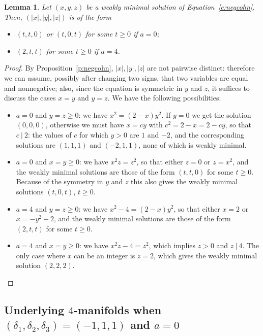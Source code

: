 \documentclass[11pt,a4paper]{amsart}
\newcommand{\de}{\delta}
\newtheorem{lemma}[thm]{Lemma}
\theoremstyle{definition}
\numberwithin{equation}{section}
\begin{document}
\begin{lemma}\label{l:negcohn}
	Let $(x,y,z)$ be a weakly minimal solution of Equation~\eqref{e:negcohn}. 
	Then, $(|x|,|y|,|z|)$ is of the form 
\begin{itemize}
    \item $(t,t,0)$ or $(t,0,t)$ for some $t\geq 0$ if $a=0$;
    \item $(2,t,t)$ for some $t\geq 0$ if $a=4$.
\end{itemize}
\end{lemma} 

\begin{proof}
By Proposition~\ref{p:negcohn}, $|x|,|y|,|z|$ are not pairwise distinct: therefore we can assume, possibly after changing two signs, that two variables are equal and nonnegative; also, since the equation is symmetric in $y$ and $z$, it suffices to discuss the cases $x=y$ and $y=z$.
We have the following possibilities:
\begin{itemize}
\item 
$a=0$ and $y=z\ge 0$: we have $x^2=(2-x)y^2$.
If $y=0$ we get the solution $(0,0,0)$, otherwise we must have $x=cy$ with $c^2=2-x=2-cy$, so that 
$c\ |\ 2$: the values of $c$ for which $y>0$ are $1$ and $-2$, and the corresponding solutions are $(1,1,1)$ and $(-2,1,1)$, none of which is weakly minimal.
\item 
$a=0$ and $x=y \ge 0$: we have $x^2z=z^2$, so that either $z=0$ or $z=x^2$, and the weakly minimal solutions are those of the form $(t,t,0)$ for some $t \ge 0$. Because of the symmetry in $y$ and $z$ this also gives 
the weakly minimal solutions $(t,0,t)$, $t\ge 0$. 
\item 
$a=4$ and $y=z \ge 0$: we have $x^2-4=(2-x)y^2$, so that either $x=2$ or $x=-y^2-2$, and the weakly minimal solutions are those of the form $(2,t,t)$ for some $t \ge 0$.
\item 
$a=4$ and $x=y \ge 0$: we have $x^2z-4=z^2$, which implies $z>0$ and $z\ |\ 4$. The only case where $x$ can be an integer is $z=2$, which gives the weakly minimal solution $(2,2,2)$.
\end{itemize}
\end{proof}

\subsection{Underlying $4$-manifolds when 
$(\de_1,\de_2,\de_3)=(-1,1,1)$ and $a=0$}\label{ss:-111-a=0} 
\end{document}
